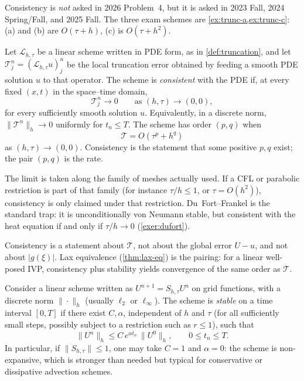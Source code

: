 \documentclass[11pt,a4paper]{article}
\begin{document}
Consistency is \emph{not} asked in 2026 Problem~4, but it is asked in 2023 Fall, 2024 Spring/Fall, and 2025 Fall. The three exam schemes are \cref{ex:trunc-a,ex:trunc-c}: (a) and (b) are \(O(\tau+h)\), (c) is \(O(\tau+h^2)\).

\begin{definition}[Consistency]
\label{def:consistency}
Let \(\mathcal L_{h,\tau}\) be a linear scheme written in PDE form, as in \cref{def:truncation}, and let \(\mathcal T_j^n=(\mathcal L_{h,\tau}u)_j^n\) be the local truncation error obtained by feeding a smooth PDE solution \(u\) to that operator. The scheme is \emph{consistent} with the PDE if, at every fixed \((x,t)\) in the space--time domain,
\[
\mathcal T_j^n
\to
0
\qquad
\text{as }
(h,\tau)\to(0,0),
\]
for every sufficiently smooth solution \(u\). Equivalently, in a discrete norm, \(\|\mathcal T^n\|_h\to 0\) uniformly for \(t_n\le T\). The scheme has order \((p,q)\) when
\[
\mathcal T
=
O(\tau^p+h^q)
\]
as \((h,\tau)\to(0,0)\). Consistency is the statement that some positive \(p,q\) exist; the pair \((p,q)\) is the rate.

The limit is taken along the family of meshes actually used. If a CFL or parabolic restriction is part of that family (for instance \(\tau/h\le 1\), or \(\tau=O(h^2)\)), consistency is only claimed under that restriction. Du~Fort--Frankel is the standard trap: it is unconditionally von Neumann stable, but consistent with the heat equation if and only if \(\tau/h\to 0\) (\cref{exer:dufort}).

Consistency is a statement about \(\mathcal T\), not about the global error \(U-u\), and not about \(\lvert g(\xi)\rvert\). Lax equivalence (\cref{thm:lax-eq}) is the pairing: for a linear well-posed IVP, consistency plus stability yields convergence of the same order as \(\mathcal T\).
\end{definition}

\begin{definition}
\label{def:lax-richtmyer}
Consider a linear scheme written as \(U^{n+1}=S_{h,\tau}U^n\) on grid functions, with a discrete norm \(\|\cdot\|_h\) (usually \(\ell_2\) or \(\ell_\infty\)). The scheme is \emph{stable} on a time interval \([0,T]\) if there exist \(C,\alpha\), independent of \(h\) and \(\tau\) (for all sufficiently small steps, possibly subject to a restriction such as \(r\le 1\)), such that
\[
\|U^n\|_h
\le
C\,e^{\alpha t_n}\,\|U^0\|_h,
\qquad
0\le t_n\le T.
\]
In particular, if \(\|S_{h,\tau}\|\le 1\), one may take \(C=1\) and \(\alpha=0\): the scheme is non-expansive, which is stronger than needed but typical for conservative or dissipative advection schemes.
\end{definition}
\end{document}
